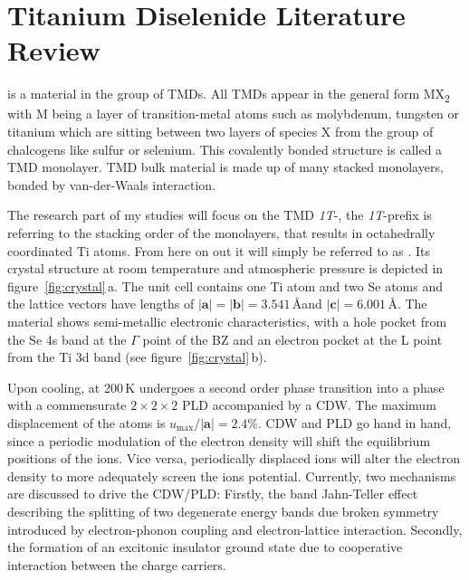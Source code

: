 \section{Titanium Diselenide Literature Review}
\ts\space is a material in the group of \acp{TMD}.
All \acp{TMD} appear in the general form MX\textsubscript{2} with M being a layer of transition-metal atoms such as molybdenum, tungsten or titanium which are sitting between two layers of species X from the group of chalcogens like sulfur or selenium.
This covalently bonded structure is called a \ac{TMD} monolayer.
\Ac{TMD} bulk material is made up of many stacked monolayers, bonded by van-der-Waals interaction.

The research part of my studies will focus on the \ac{TMD} \textit{1T}-\ts, the \textit{1T}-prefix is referring to the stacking order of the monolayers, that results in octahedrally coordinated Ti atoms.
From here on out it will simply be referred to as \ts.
Its crystal structure at room temperature and atmospheric pressure is depicted in figure~\ref{fig:crystal}\,a.
The unit cell contains one Ti atom and two Se atoms and the lattice vectors have lengths of $|\mathbf{a}|=|\mathbf{b}|=3.541$\,\AA\space and $|\mathbf{c}|=6.001$\,\AA\cite{patel1983}.
The material shows semi-metallic electronic characteristics\cite{bachrach1976}, with a hole pocket from the Se 4s band at the $\Gamma$ point of the \ac{BZ} and an electron pocket at the L point from the Ti 3d band\cite{zunger1978} (see figure~\ref{fig:crystal}\,b).

Upon cooling, at 200\,K\cite{disalvo1976} \ts\space undergoes a second order phase transition into a phase with a commensurate $2\times2\times2$ \ac{PLD} accompanied by a \ac{CDW}\cite{rossnagel2011}.
The maximum displacement of the atoms is $u_\mathrm{max}/|\mathbf{a}|=2.4\%$\cite{disalvo1976}.
\ac{CDW} and \ac{PLD} go hand in hand, since a periodic modulation of the electron density will shift the equilibrium positions of the ions.
Vice versa, periodically displaced ions will alter the electron density to more adequately screen the ions potential.
Currently, two mechanisms are discussed to drive the \ac{CDW}/\ac{PLD}: 
Firstly, the band Jahn-Teller effect describing the splitting of two degenerate energy bands due broken symmetry introduced by electron-phonon coupling and electron-lattice interaction\cite{rossnagel2002}.
Secondly, the formation of an excitonic insulator ground state due to cooperative interaction between the charge carriers\cite{cercellier2007,kogar2017}.

